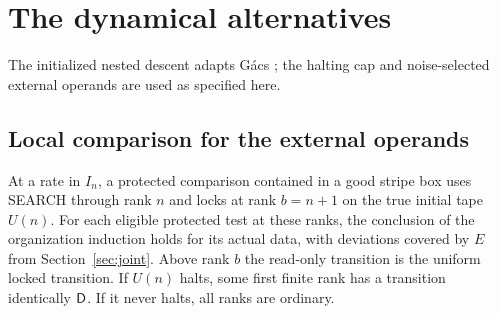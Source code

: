 \section{The dynamical alternatives}\label{sec:dynamics}
The initialized nested descent adapts G\'acs \cite[Section~11, Lemmas~11.1--11.2]{gacs86}; the halting cap and noise-selected external operands are used as specified here.

\subsection{Local comparison for the external operands}\label{sec:environment}

\begin{lemma}\label{lem:locking}
At a rate in \(I_n\), a protected comparison contained in a good stripe box uses SEARCH through rank \(n\) and locks at rank \(b=n+1\) on the true initial tape \(U(n)\). For each eligible protected test at these ranks, the conclusion of the organization induction holds for its actual data, with deviations covered by \(E\) from Section~\ref{sec:joint}. Above rank \(b\) the read-only transition is the uniform locked transition. If \(U(n)\) halts, some first finite rank has a transition identically \(\mathsf D\). If it never halts, all ranks are ordinary.
\end{lemma}

